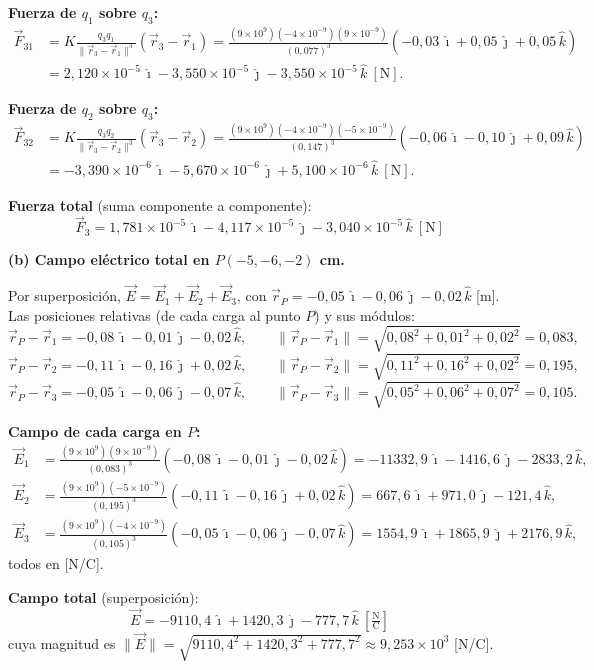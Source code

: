 \documentclass[12pt,letterpaper]{article}
\newcommand{\secgap}{\vspace{0.6cm}}
\newcommand{\ii}{\hat{\imath}}
\newcommand{\jj}{\hat{\jmath}}
\newcommand{\kk}{\hat{k}}
\begin{document}
\noindent\textbf{Fuerza de $q_1$ sobre $q_3$:}
\begin{align*}
    \vec F_{31} &= K\frac{q_3 q_1}{\lVert \vec r_3-\vec r_1\rVert^{3}}(\vec r_3-\vec r_1)
    = \frac{(9\times10^{9})(-4\times10^{-9})(9\times10^{-9})}{(0{,}077)^{3}}
      (-0{,}03\,\ii + 0{,}05\,\jj + 0{,}05\,\kk)\\
    &= 2{,}120\times10^{-5}\,\ii - 3{,}550\times10^{-5}\,\jj - 3{,}550\times10^{-5}\,\kk\ [\text{N}].
\end{align*}

\noindent\textbf{Fuerza de $q_2$ sobre $q_3$:}
\begin{align*}
    \vec F_{32} &= K\frac{q_3 q_2}{\lVert \vec r_3-\vec r_2\rVert^{3}}(\vec r_3-\vec r_2)
    = \frac{(9\times10^{9})(-4\times10^{-9})(-5\times10^{-9})}{(0{,}147)^{3}}
      (-0{,}06\,\ii - 0{,}10\,\jj + 0{,}09\,\kk)\\
    &= -3{,}390\times10^{-6}\,\ii - 5{,}670\times10^{-6}\,\jj + 5{,}100\times10^{-6}\,\kk\ [\text{N}].
\end{align*}

\noindent\textbf{Fuerza total} (suma componente a componente):
\[
    \boxed{\vec F_3 = 1{,}781\times10^{-5}\,\ii - 4{,}117\times10^{-5}\,\jj - 3{,}040\times10^{-5}\,\kk\ [\text{N}]}
\]

\secgap

\noindent\textbf{(b) Campo el\'ectrico total en $P(-5,-6,-2)$ cm.}

Por superposici\'on, $\vec E = \vec E_1 + \vec E_2 + \vec E_3$, con $\vec r_P = -0{,}05\,\ii - 0{,}06\,\jj
- 0{,}02\,\kk$ [m]. Las posiciones relativas (de cada carga al punto $P$) y sus m\'odulos:
\[
    \vec r_P-\vec r_1 = -0{,}08\,\ii - 0{,}01\,\jj - 0{,}02\,\kk,\qquad
    \lVert \vec r_P-\vec r_1\rVert = \sqrt{0{,}08^2+0{,}01^2+0{,}02^2} = 0{,}083,
\]
\[
    \vec r_P-\vec r_2 = -0{,}11\,\ii - 0{,}16\,\jj + 0{,}02\,\kk,\qquad
    \lVert \vec r_P-\vec r_2\rVert = \sqrt{0{,}11^2+0{,}16^2+0{,}02^2} = 0{,}195,
\]
\[
    \vec r_P-\vec r_3 = -0{,}05\,\ii - 0{,}06\,\jj - 0{,}07\,\kk,\qquad
    \lVert \vec r_P-\vec r_3\rVert = \sqrt{0{,}05^2+0{,}06^2+0{,}07^2} = 0{,}105.
\]

\noindent\textbf{Campo de cada carga en $P$:}
\begin{align*}
    \vec E_1 &= \frac{(9\times10^{9})(9\times10^{-9})}{(0{,}083)^{3}}(-0{,}08\,\ii - 0{,}01\,\jj - 0{,}02\,\kk)
    = -11332{,}9\,\ii - 1416{,}6\,\jj - 2833{,}2\,\kk,\\
    \vec E_2 &= \frac{(9\times10^{9})(-5\times10^{-9})}{(0{,}195)^{3}}(-0{,}11\,\ii - 0{,}16\,\jj + 0{,}02\,\kk)
    = 667{,}6\,\ii + 971{,}0\,\jj - 121{,}4\,\kk,\\
    \vec E_3 &= \frac{(9\times10^{9})(-4\times10^{-9})}{(0{,}105)^{3}}(-0{,}05\,\ii - 0{,}06\,\jj - 0{,}07\,\kk)
    = 1554{,}9\,\ii + 1865{,}9\,\jj + 2176{,}9\,\kk,
\end{align*}
todos en [N/C].

\noindent\textbf{Campo total} (superposici\'on):
\[
    \boxed{\vec E = -9110{,}4\,\ii + 1420{,}3\,\jj - 777{,}7\,\kk\ \left[\tfrac{\text{N}}{\text{C}}\right]}
\]
cuya magnitud es $\lVert\vec E\rVert = \sqrt{9110{,}4^2 + 1420{,}3^2 + 777{,}7^2} \approx 9{,}253\times10^{3}$ [N/C].
\end{document}

